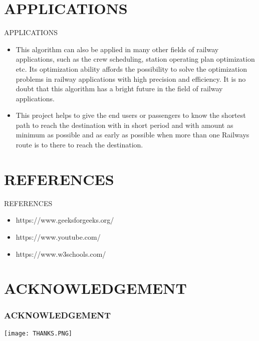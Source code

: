 \documentclass[aspectratio=169,xcolor=dvipsnames]{beamer}
\begin{document}

\section{\textcolor[RGB]{255,0,0}{APPLICATIONS}}

\begin{frame}{APPLICATIONS}
\begin{itemize}

   \item This algorithm can also be applied in many other fields of railway 
applications, such as the crew scheduling, station operating 
plan optimization etc. Its optimization ability affords the 
possibility to solve the optimization problems in railway 
applications with high precision and efficiency. It is no doubt 
that this algorithm has a bright future in the field of railway applications.
   \item This project helps to give 
the end users or passengers to know the shortest path to reach 
the destination with in short period and with amount as 
minimum as possible and as early as possible when more than 
one Railways route is to there to reach the destination.

\end{itemize}
\end{frame}



\section{\textcolor[RGB]{255,0,0}{REFERENCES}}
\begin{frame}{REFERENCES}
\begin{itemize}

   \item https://www.geeksforgeeks.org/
   \item https://www.youtube.com/
   \item https://www.w3schools.com/
  
\end{itemize}    
\end{frame}


\section{\textcolor[RGB]{255,0,0}{ACKNOWLEDGEMENT}}
\begin{frame}
\frametitle{{\textbf{ACKNOWLEDGEMENT}}}
\begin{center}

\texttt{[image: THANKS.PNG]}

\end{center}
\end{frame}
\end{document}
